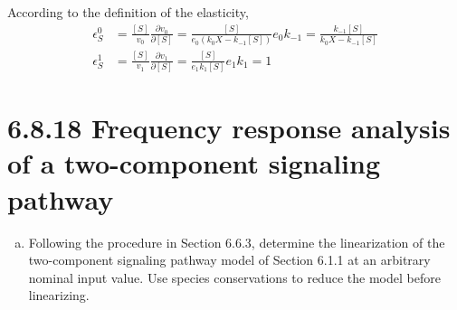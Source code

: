 \documentclass[paper=a4, fontsize=11pt]{scrartcl} %
\numberwithin{equation}{section} %
\numberwithin{figure}{section} %
\numberwithin{table}{section} %
\begin{document}
\begin{enumerate}[a)]
		According to the definition of the elasticity,
		\begin{align*}
			\epsilon_S^0 &= \frac{[S]}{v_0}\frac{\partial v_0}{\partial[S]}=\frac{[S]}{e_0(k_0X - k_{-1}[S])}e_0k_{-1}=\frac{k_{-1}[S]}{k_0X - k_{-1}[S]} \\
			\epsilon_S^1 &= \frac{[S]}{v_1}\frac{\partial v_1}{\partial[S]}=\frac{[S]}{e_1k_1[S]}e_1k_1=1
		\end{align*}

	\end{enumerate}

\section{6.8.18 Frequency response analysis of a two-component signaling pathway}
	\begin{enumerate}[a)]
		\item Following the procedure in Section 6.6.3, determine the linearization of the two-component signaling pathway model of Section 6.1.1 at an arbitrary nominal input value. Use species conservations to reduce the model before linearizing.


\end{enumerate}
\end{document}
